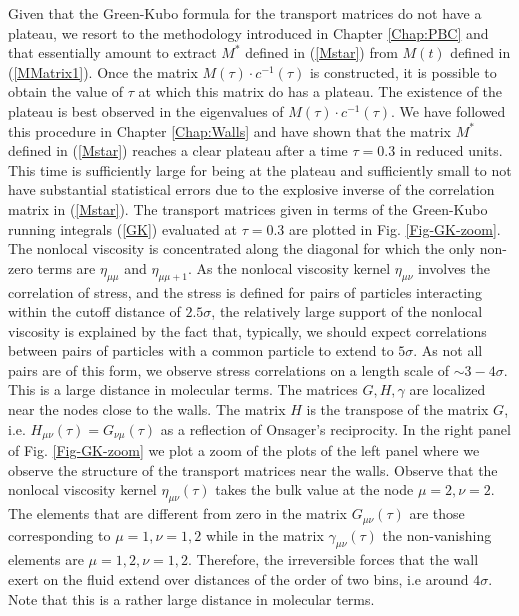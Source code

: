 \documentclass[b5paper,openright,10pt]{book}
\newcommand{\esc}{\!\cdot\!}
\begin{document}
Given that the  Green-Kubo formula for the transport  matrices do not
have  a   plateau,  we  resort   to  the  methodology   introduced  in
Chapter \ref{Chap:PBC} and that essentially amount to extract $M^*$ defined in
(\ref{Mstar}) from $M(t)$ defined in (\ref{MMatrix1}). Once the matrix
$M(\tau)\esc c^{-1}(\tau)$  is constructed,  it is possible  to obtain
the  value of  $\tau$  at which  this  matrix do  has  a plateau.  The
existence  of the  plateau  is  best observed  in  the eigenvalues  of
$M(\tau)\esc  c^{-1}(\tau)$.   We  have  followed  this  procedure  in
Chapter \ref{Chap:Walls}
and have shown that the  matrix $M^*$ defined in (\ref{Mstar}) reaches
a clear plateau  after a time $\tau=0.3$ in reduced  units.  This time
is sufficiently large for being  at the plateau and sufficiently small
to  not  have substantial  statistical  errors  due to  the  explosive
inverse  of the  correlation  matrix in  (\ref{Mstar}). The  transport
matrices given in terms of the Green-Kubo running integrals (\ref{GK})
evaluated  at  $\tau=0.3$  are  plotted in  Fig.   \ref{Fig-GK-zoom}.   The
nonlocal viscosity is  concentrated along the diagonal  for which the
only non-zero terms are  $\eta_{\mu\mu}$ and $\eta_{\mu\mu+1}$. As the
nonlocal viscosity kernel $\eta_{\mu\nu}$ involves the correlation of
stress, and the  stress is defined for pairs  of particles interacting
within  the  cutoff  distance  of $2.5\sigma$,  the  relatively  large
support of the nonlocal viscosity is  explained by  the fact that,  typically, we  should expect
correlations  between pairs  of particles  with a  common particle  to
extend to  $5\sigma$. As not  all pairs are  of this form,  we observe
stress correlations on  a length scale of $\sim 3-4\sigma$.  This is a
large  distance in  molecular  terms.  The  matrices $G,H,\gamma$  are
localized near  the nodes close to  the walls.  The matrix  $H$ is the
transpose of the matrix $G$, i.e.  $H_{\mu\nu}(\tau)=G_{\nu\mu}(\tau)$
as a reflection of  Onsager's reciprocity.  In the right panel of Fig.  \ref{Fig-GK-zoom}
we plot  a zoom of the plots of the left panel where we observe  the structure of
the transport  matrices near  the walls.   Observe that  the nonlocal
viscosity  kernel $\eta_{\mu\nu}(\tau)$  takes the  bulk value  at the
node $\mu=2,\nu=2$. The  elements that are different from  zero in the
matrix $G_{\mu\nu}(\tau)$  are those corresponding  to $\mu=1,\nu=1,2$
while in the matrix $\gamma_{\mu\nu}(\tau)$ the non-vanishing elements
are $\mu=1,2,  \nu=1,2$.  Therefore, the irreversible  forces that the
wall exert  on the  fluid extend  over distances of  the order  of two
bins, i.e around $4\sigma$.  Note that this is a rather large distance
in molecular terms.
\end{document}
